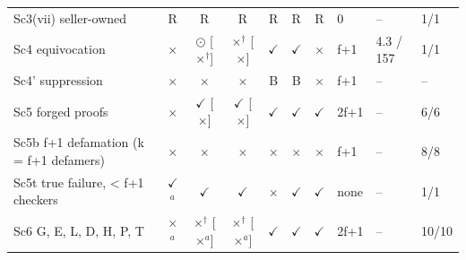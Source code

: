 \documentclass[10pt]{article}
\begin{document}
\begin{table}[!htbp]
\begin{tabular}{@{}lcccccclll@{}}
Sc3(vii) seller-owned & R & R & R & R & R & R & 0 & -- & 1/1 \\
Sc4 equivocation & $\times$ & $\odot$ [$\times$$^{\dagger}$] & $\times$$^{\dagger}$ [$\times$] & $\checkmark$ & $\checkmark$ & $\times$ & f+1 & 4.3 / 157 & 1/1 \\
Sc4' suppression & $\times$ & $\times$ & $\times$ & B & B & $\times$ & f+1 & -- & -- \\
Sc5 forged proofs & $\times$ & $\checkmark$ [$\times$] & $\checkmark$ [$\times$] & $\checkmark$ & $\checkmark$ & $\checkmark$ & 2f+1 & -- & 6/6 \\
Sc5b f+1 defamation (k = f+1 defamers) & $\times$ & $\times$ & $\times$ & $\times$ & $\times$ & $\times$ & f+1 & -- & 8/8 \\
Sc5t true failure, < f+1 checkers & $\checkmark$$^{a}$ & $\checkmark$ & $\checkmark$ & $\times$ & $\checkmark$ & $\checkmark$ & none & -- & 1/1 \\
Sc6 G, E, L, D, H, P, T & $\times$$^{a}$ & $\times$$^{\dagger}$ [$\times$$^{a}$] & $\times$$^{\dagger}$ [$\times$$^{a}$] & $\checkmark$ & $\checkmark$ & $\checkmark$ & 2f+1 & -- & 10/10 \\
\bottomrule
\end{tabular}
\end{table}
\end{document}
